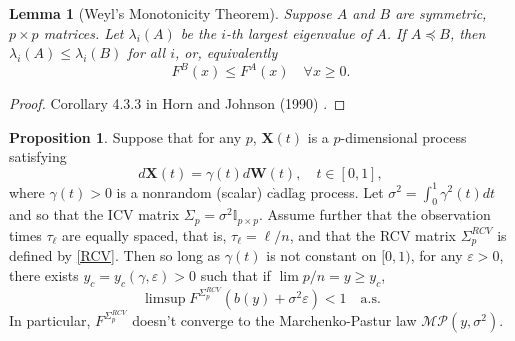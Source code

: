 \documentclass[a4paper,11pt]{book}
\theoremstyle{plain}
\newtheorem{lmm}[thm]{Lemma}
\theoremstyle{definition}
\newtheorem{prps}[thm]{Proposition}
\begin{document}
	\begin{lmm}[Weyl's Monotonicity Theorem] \label{Weyl}
		Suppose $A$ and $B$ are symmetric, $p \times p$ matrices. Let $\lambda_i(A)$ be the $i$-th largest eigenvalue of $A$. If $A \preceq B$, then $\lambda_i(A) \leq \lambda_i(B)$ for all $i$, or, equivalently
		\[ F^B(x) \leq F^A(x) \quad \forall x \geq 0. \]
    \end{lmm}
    \begin{proof}
    	Corollary 4.3.3 in Horn and Johnson (1990) \cite{HornJohsnon}.
    \end{proof}
		
	\begin{prps} \label{counter RCV}
		Suppose that for any $p$, $\mathbf{X}(t)$ is a $p$-dimensional process satisfying
		\begin{equation}
		d \mathbf{X}(t) = \gamma(t) d\mathbf{W}(t), \quad t \in [0, 1],
		\end{equation}
		where $\gamma(t) > 0$ is a nonrandom (scalar) c$\grave{\text{a}}$dl$\grave{\text{a}}$g process. Let $\sigma^2 = \int_0^1 \gamma^2(t) dt$ and so that the ICV matrix $\Sigma_p = \sigma^2 \mathbb{I}_{p \times p}$. Assume further that the observation times $\tau_{\ell}$ are equally spaced, that is, $\tau_{\ell} = \ell / n$, and that the RCV matrix $\Sigma_p^{RCV}$ is defined by \eqref{RCV}. Then so long as $\gamma(t)$ is not constant on $[0, 1)$, for any $\varepsilon > 0$, there exists $y_c = y_c(\gamma, \varepsilon) > 0$ such that if $\lim p/n = y \geq y_c$,
		\begin{equation}
			\limsup F^{\Sigma_p^{RCV}}(b(y)+\sigma^2\varepsilon) < 1 \quad \text{a.s.}
		\end{equation}
		In particular, $F^{\Sigma_p^{RCV}}$ doesn't converge to the Marchenko-Pastur law $\mathcal{MP}(y, \sigma^2)$.
    \end{prps}
    
\end{document}
